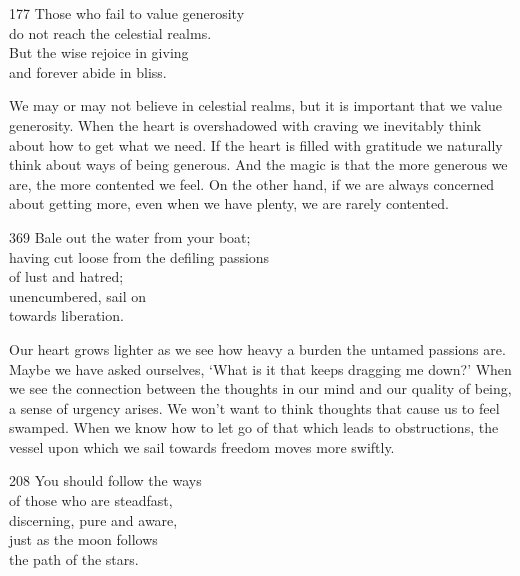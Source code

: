 
\begin{dhpVerse}{177}
\label{dhp-177}
Those who fail to value generosity\\
do not reach the celestial realms. \\
But the wise rejoice in giving\\
and forever abide in bliss.
\end{dhpVerse}

\begin{dhpRefl}
We may or may not believe in celestial realms, but it is important that we value generosity. When the heart is overshadowed with craving we inevitably think about how to get what we need. If the heart is filled with gratitude we naturally think about ways of being generous. And the magic is that the more generous we are, the more contented we feel. On the other hand, if we are always concerned about getting more, even when we have plenty, we are rarely contented.
\end{dhpRefl}


\begin{dhpVerse}{369}
\label{dhp-369}
Bale out the water from your boat;\\
having cut loose from the defiling passions\\
of lust and hatred;\\
unencumbered, sail on\\
towards liberation.
\end{dhpVerse}

\begin{dhpRefl}
Our heart grows lighter as we see how heavy a burden the untamed passions are. Maybe we have asked ourselves, `What is it that keeps dragging me down?' When we see the connection between the thoughts in our mind and our quality of being, a sense of urgency arises. We won't want to think thoughts that cause us to feel swamped. When we know how to let go of that which leads to obstructions, the vessel upon which we sail towards freedom moves more swiftly.
\end{dhpRefl}


\begin{dhpVerse}{208}
\label{dhp-208}
You should follow the ways\\
of those who are steadfast,\\
discerning, pure and aware,\\
just as the moon follows\\
the path of the stars.
\end{dhpVerse}

